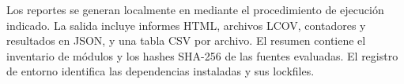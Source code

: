 Los reportes se generan localmente en  mediante el procedimiento de ejecución indicado. La salida incluye informes HTML, archivos LCOV, contadores y resultados en JSON, y una tabla CSV por archivo. El resumen contiene el inventario de módulos y los hashes SHA-256 de las fuentes evaluadas. El registro de entorno identifica las dependencias instaladas y sus lockfiles.

